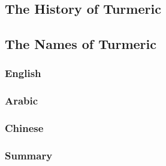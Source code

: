 
\subsection{The History of Turmeric}

\subsection{The Names of Turmeric}
\label{sec:names_of_turmeric}

\subsubsection{English}





\subsubsection{Arabic}





\subsubsection{Chinese}





\subsubsection{Summary}

















